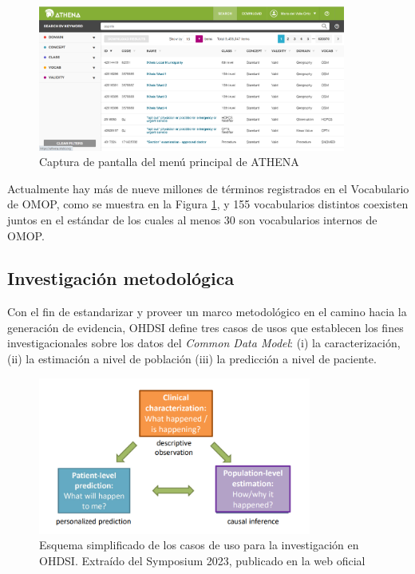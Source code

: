 \begin{figure}[H]
\centering
\includegraphics[width=0.90\textwidth]{figures/ATHENAcap.png}
     \caption{Captura de pantalla del menú principal de ATHENA}
    \label{fig:ATHENAcap}
\end{figure}

Actualmente hay más de nueve millones de términos registrados en el Vocabulario de OMOP, como se muestra en la Figura \ref{fig:ATHENAcap}, y 155 vocabularios distintos coexisten juntos en el estándar de los cuales al menos 30 son vocabularios internos de OMOP.


\subsection{Investigación metodológica} \label{subsec:05investMetodolog}

Con el fin de estandarizar y proveer un marco metodológico en el camino hacia la generación de evidencia, OHDSI define tres casos de usos que establecen los fines investigacionales sobre los datos del \textit{Common Data Model}: (i) la caracterización, (ii) la estimación a nivel de población (iii) la predicción a nivel de paciente. 

\begin{figure}[H]
\centering
\includegraphics[width=0.80\textwidth]{figures/useCases.png}
     \caption{Esquema simplificado de los casos de uso para la investigación en OHDSI. Extraído del Symposium 2023, publicado en la web oficial \cite{OHDSIwebsite}}
    \label{fig:useCases}
\end{figure}

